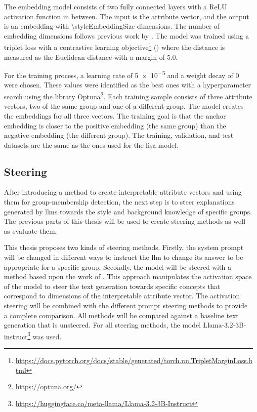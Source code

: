 The embedding model consists of two fully connected layers with a ReLU activation function in between. The input is the attribute vector, and the output is an embedding with \num{\styleEmbeddingSize} dimensions. The number of embedding dimensions follows previous work by \citet{patelLearningInterpretableStyle2023}. The model was trained using a triplet loss with a contrastive learning objective\footnote{\url{https://docs.pytorch.org/docs/stable/generated/torch.nn.TripletMarginLoss.html}} (\cite{NEURIPS2020_d89a66c7}) where the distance is measured as the Euclidean distance with a margin of \num{5.0}.

For the training process, a learning rate of \num{5e-5} and a weight decay of \num{0} were chosen. These values were identified as the best ones with a hyperparameter search using the library Optuna\footnote{\url{https://optuna.org/}}.
Each training sample consists of three attribute vectors, two of the same group and one of a different group. The model creates the embeddings for all three vectors. The training goal is that the anchor embedding is closer to the positive embedding (the same group) than the negative embedding (the different group). The training, validation, and test datasets are the same as the ones used for the \ac{lisa} model.


\subsection{Steering}
\label{sec:experiments:setup:steering}
After introducing a method to create interpretable attribute vectors and using them for group-membership detection, the next step is to steer explanations generated by \aclp{llm} towards the style and background knowledge of specific groups. The previous parts of this thesis will be used to create steering methods as well as evaluate them.

This thesis proposes two kinds of steering methods. Firstly, the system prompt will be changed in different ways to instruct the \ac{llm} to change its answer to be appropriate for a specific group. Secondly, the model will be steered with a method based upon the work of \citet{konenStyleVectorsSteering2024,turnerActivationAdditionSteering2024,rimsky-etal-2024-steering}. This approach manipulates the activation space of the model to steer the text generation towards specific concepts that correspond to dimensions of the interpretable attribute vector. The activation steering will be combined with the different prompt steering methods to provide a complete comparison.
All methods will be compared against a baseline text generation that is unsteered.
For all steering methods, the model Llama-3.2-3B-instruct\footnote{\url{https://huggingface.co/meta-llama/Llama-3.2-3B-Instruct}} was used.

